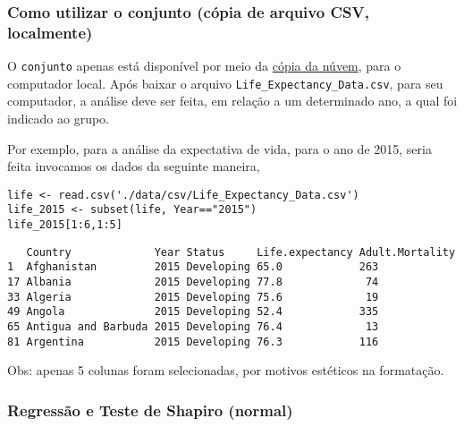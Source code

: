 \documentclass[11pt]{article}
\begin{document}
\subsubsection{Como utilizar o conjunto (cópia de arquivo CSV, localmente)}
\label{sec:org2d985db}
O \texttt{conjunto} apenas está disponível por meio da \href{https://drive.google.com/file/d/1nUnOwgAcWIqoyG0P5\_wnlh1wPxxSUqv5/view?usp=sharing}{cópia da núvem}, para o
computador local. Após baixar o arquivo \texttt{Life\_Expectancy\_Data.csv},
para seu computador, a análise deve ser feita, em relação a um
determinado ano, a qual foi indicado ao grupo.

Por exemplo, para a análise da expectativa de vida, para o ano de
2015, seria feita invocamos os dados da seguinte maneira,

\begin{verbatim}
life <- read.csv('./data/csv/Life_Expectancy_Data.csv')
life_2015 <- subset(life, Year=="2015")
life_2015[1:6,1:5] 
\end{verbatim}

\begin{verbatim}
   Country             Year Status     Life.expectancy Adult.Mortality
1  Afghanistan         2015 Developing 65.0            263            
17 Albania             2015 Developing 77.8             74            
33 Algeria             2015 Developing 75.6             19            
49 Angola              2015 Developing 52.4            335            
65 Antigua and Barbuda 2015 Developing 76.4             13            
81 Argentina           2015 Developing 76.3            116            
\end{verbatim}


Obs: apenas 5 colunas foram selecionadas, por motivos estéticos na formatação.

\subsubsection{Regressão e Teste de Shapiro (normal)}
\label{sec:org3571cd4}
\end{document}
